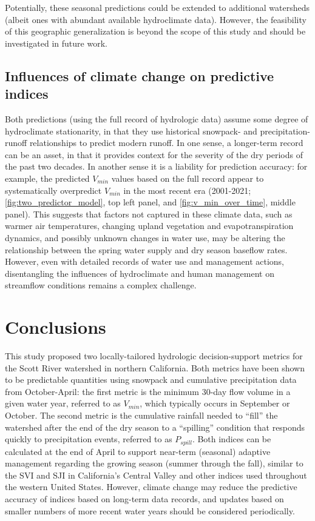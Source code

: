 \documentclass[hess, manuscript]{copernicus}
\begin{document}
Potentially, these seasonal predictions could be extended to additional
watersheds (albeit ones with abundant available hydroclimate data).
However, the feasibility of this geographic generalization is beyond the
scope of this study and should be investigated in future work.

\subsection{Influences of climate change on predictive indices}

Both predictions (using the full record of hydrologic data) assume some
degree of hydroclimate stationarity, in that they use historical
snowpack- and precipitation-runoff relationships to predict modern
runoff. In one sense, a longer-term record can be an asset, in that it
provides context for the severity of the dry periods of the past two
decades. In another sense it is a liability for prediction accuracy: for
example, the predicted \(V_{min}\) values based on the full record
appear to systematically overpredict \(V_{min}\) in the most recent era
(2001-2021; \autoref{fig:two_predictor_model}, top left panel, and
\autoref{fig:v_min_over_time}, middle panel). This suggests that factors
not captured in these climate data, such as warmer air temperatures,
changing upland vegetation and evapotranspiration dynamics, and possibly
unknown changes in water use, may be altering the relationship between
the spring water supply and dry season baseflow rates. However, even
with detailed records of water use and management actions, disentangling
the influences of hydroclimate and human management on streamflow
conditions remains a complex challenge.

\section{Conclusions}

This study proposed two locally-tailored hydrologic decision-support
metrics for the Scott River watershed in northern California. Both
metrics have been shown to be predictable quantities using snowpack and
cumulative precipitation data from October-April: the first metric is
the minimum 30-day flow volume in a given water year, referred to as
\(V_{min}\), which typically occurs in September or October. The second
metric is the cumulative rainfall needed to ``fill'' the watershed after
the end of the dry season to a ``spilling'' condition that responds
quickly to precipitation events, referred to as \(P_{spill}\). Both
indices can be calculated at the end of April to support near-term
(seasonal) adaptive management regarding the growing season (summer
through the fall), similar to the SVI and SJI in California's Central
Valley and other indices used throughout the western United States.
However, climate change may reduce the predictive accuracy of indices
based on long-term data records, and updates based on smaller numbers of
more recent water years should be considered periodically.
\end{document}
